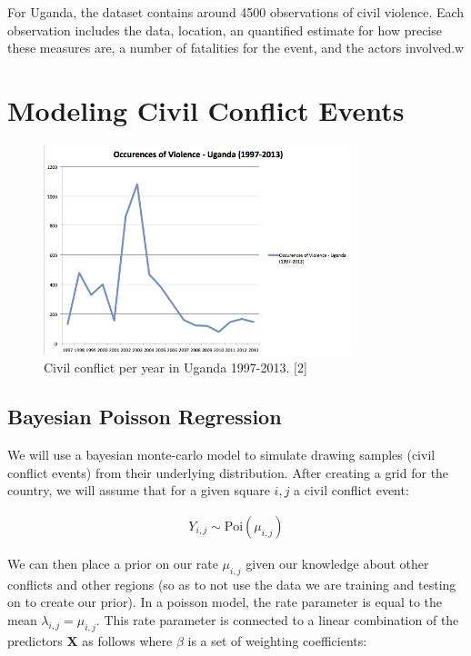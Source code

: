 \documentclass{article} %
\begin{document}
For Uganda, the dataset contains around 4500 observations of civil violence. Each observation includes the data, location, an quantified estimate for how precise these measures are, a number of fatalities for the event, and the actors involved.w

\section{Modeling Civil Conflict Events}

\begin{figure}
  \centering
  \includegraphics[width=0.8\textwidth]{PerYear.png}
  \caption{Civil conflict per year in Uganda 1997-2013. [2]}
  \label{fig:shells}
\end{figure}

\subsection{Bayesian Poisson Regression}

We will use a bayesian monte-carlo model to simulate drawing samples (civil conflict events) from their underlying distribution. After creating a grid for the country, we will assume that for a given square $i,j$ a civil conflict event:

\begin{align}
Y_{i,j} \sim \text{Poi}(\mu_{i,j})
\end{align}

We can then place a prior on our rate $\mu_{i,j}$ given our knowledge about other conflicts and other regions (so as to not use the data we are training and testing on to create our prior). In a poisson model, the rate parameter is equal to the mean $\lambda_{i,j} = \mu_{i,j}$. This rate parameter is connected to a linear combination of the predictors $\mathbf{X}$ as follows where $\beta$ is a set of weighting coefficients:
\end{document}
